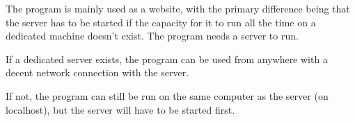 The program is mainly used as a website, with the primary difference being
 that the server has to be started if the capacity for it to run 
 all the time on a dedicated machine doesn't exist. 
The program needs a server to run. 

If a dedicated server exists, the program can be used from anywhere
 with a decent network connection with the server.

If not, the program can still be run on the same computer as 
the server (on localhost), but the server will have to be started first.
 

